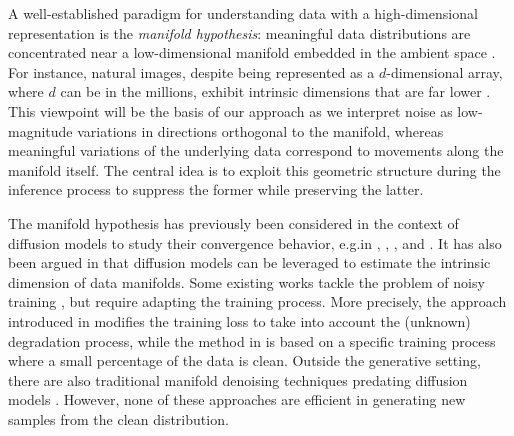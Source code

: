 \documentclass{article}
\theoremstyle{plain}
\theoremstyle{definition}
\theoremstyle{remark}
\begin{document}
A well-established paradigm for understanding data with a high-dimensional representation is the \textit{manifold hypothesis}: meaningful data distributions are concentrated near a low-dimensional manifold embedded in the ambient space \citep{bengio2013representation,fefferman2016testing}. For instance, natural images, despite being represented as a $d$-dimensional array, where $d$ can be in the millions, exhibit intrinsic dimensions that are far lower \citep{pope2021intrinsic}. 
This viewpoint will be the basis of our approach as we interpret noise as low-magnitude variations in directions orthogonal to the manifold, whereas meaningful variations of the underlying data correspond to movements along the manifold itself. The central idea is to exploit this geometric structure during the inference process to suppress the former while preserving the latter.

The manifold hypothesis has previously been considered in the context of diffusion models to study their convergence behavior, e.g.\@ in \cite{debortoli2023convergence}, \cite{pmlr-v202-chen23o}, \cite{tang2024adaptivity}, and \cite{potaptchik2024linear}. It has also been argued in \cite{stanczuk2024diffusion} that diffusion models can be leveraged to estimate the intrinsic dimension of data manifolds.
Some existing works tackle the problem of noisy training \citep{daras2024ambient,lu2025stochastic}, but require adapting the training process. More precisely, the approach introduced in \cite{daras2024ambient} modifies the training loss to take into account the (unknown) degradation process, while the method in \cite{lu2025stochastic} is based on a specific training process where a small percentage of the data is clean. Outside the generative setting, there are also traditional manifold denoising techniques predating diffusion models \citep{hein2006manifold,gong2010manifold,wang2010manifold,fefferman2018fitting,JCAM-2023}. However, none of these approaches are efficient in generating new samples from the clean distribution.
\end{document}
